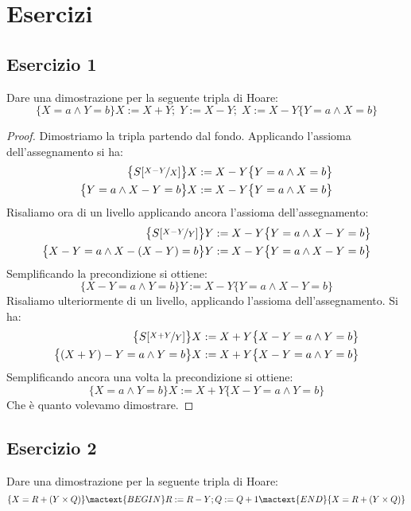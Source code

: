 \section{Esercizi}

\subsection{Esercizio 1}
Dare una dimostrazione per la seguente tripla di Hoare:
\[ \{X=a  \land Y=b\}  X:=X+Y; \; Y:=X-Y; \; X:=X-Y  \{Y=a  \land  X=b\} \]

\begin{proof}
Dimostriamo la tripla partendo dal fondo. Applicando l'assioma dell'assegnamento si ha:
\begin{align*}
  \bigl\{S[\nicefrac{X-Y}{X}] \bigr\} &  X:=X-Y  \bigl\{Y=a  \land  X=b\bigr\}\\
  \bigl\{Y=a  \land X-Y=b \bigr\} & X:=X-Y  \bigl\{Y=a  \land  X=b\bigr\}
\end{align*}
Risaliamo ora di un livello applicando ancora l'assioma dell'assegnamento:
\begin{align*}
  \bigl\{S[\nicefrac{X-Y}{Y}] \bigr\} & Y:=X-Y \bigl\{Y=a  \land  X-Y=b\bigr\}\\
  \bigl\{X-Y=a  \land X-(X-Y)=b \bigr\} & Y:=X-Y \bigl\{Y=a  \land  X-Y=b\bigr\}
\end{align*}
Semplificando la precondizione si ottiene:
\[ \bigl\{X-Y=a  \land Y=b \bigr\}  Y:=X-Y  \bigl\{Y=a  \land  X-Y=b\bigr\} \]
Risaliamo ulteriormente di un livello, applicando l'assioma dell'assegnamento. Si ha:
\begin{align*}
  \bigl\{S[\nicefrac{X+Y}{Y}] \bigr\} & X:=X+Y \bigl\{X-Y=a  \land  Y=b\bigr\}\\
  \bigl\{(X+Y)-Y=a  \land Y=b \bigr\} & X:=X+Y \bigl\{X-Y=a  \land  Y=b\bigr\}
\end{align*}
Semplificando ancora una volta la precondizione si ottiene:
\[ \bigl\{X=a  \land Y=b \bigr\}  X:=X+Y  \bigl\{X-Y=a  \land  Y=b\bigr\} \]
Che è quanto volevamo dimostrare.
\end{proof}

\subsection{Esercizio 2}
Dare una dimostrazione per la seguente tripla di Hoare:
\[
  \{X=R+(Y \times Q) \} \mactext{BEGIN } R:=R-Y; Q:=Q+1
  \mactext{ END} \{X=R+(Y \times Q)\}
\]

